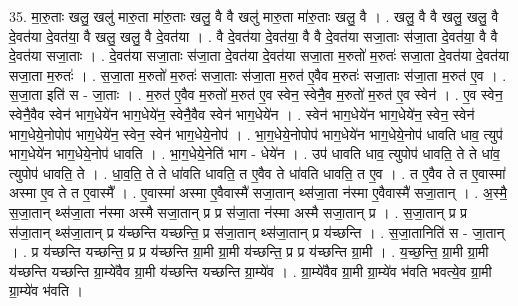 \documentclass[17pt]{extarticle}
\begin{document}
35. मा॒रु॒ताः खलु॒ खलु॑ मारु॒ता मा॑रु॒ताः खलु॒ वै वै खलु॑ मारु॒ता मा॑रु॒ताः खलु॒ वै । . खलु॒ वै वै खलु॒ खलु॒ वै दे॒वत॑या दे॒वत॑या॒ वै खलु॒ खलु॒ वै दे॒वत॑या । . वै दे॒वत॑या दे॒वत॑या॒ वै वै दे॒वत॑या सजा॒ताः स॑जा॒ता दे॒वत॑या॒ वै वै दे॒वत॑या सजा॒ताः । . दे॒वत॑या सजा॒ताः स॑जा॒ता दे॒वत॑या दे॒वत॑या सजा॒ता म॒रुतो॑ म॒रुतः॑ सजा॒ता दे॒वत॑या दे॒वत॑या सजा॒ता म॒रुतः॑ । . स॒जा॒ता म॒रुतो॑ म॒रुतः॑ सजा॒ताः स॑जा॒ता म॒रुत॑ ए॒वैव म॒रुतः॑ सजा॒ताः स॑जा॒ता म॒रुत॑ ए॒व । . स॒जा॒ता इति॑ स - जा॒ताः । . म॒रुत॑ ए॒वैव म॒रुतो॑ म॒रुत॑ ए॒व स्वेन॒ स्वेनै॒व म॒रुतो॑ म॒रुत॑ ए॒व स्वेन॑ । . ए॒व स्वेन॒ स्वेनै॒वैव स्वेन॑ भाग॒धेये॑न भाग॒धेये॑न॒ स्वेनै॒वैव स्वेन॑ भाग॒धेये॑न । . स्वेन॑ भाग॒धेये॑न भाग॒धेये॑न॒ स्वेन॒ स्वेन॑ भाग॒धेये॒नोपोप॑ भाग॒धेये॑न॒ स्वेन॒ स्वेन॑ भाग॒धेये॒नोप॑ । . भा॒ग॒धेये॒नोपोप॑ भाग॒धेये॑न भाग॒धेये॒नोप॑ धावति धाव॒ त्युप॑ भाग॒धेये॑न भाग॒धेये॒नोप॑ धावति । . भा॒ग॒धेये॒नेति॑ भाग - धेये॑न । . उप॑ धावति धाव॒ त्युपोप॑ धावति॒ ते ते धा॑व॒ त्युपोप॑ धावति॒ ते । . धा॒व॒ति॒ ते ते धा॑वति धावति॒ त ए॒वैव ते धा॑वति धावति॒ त ए॒व । . त ए॒वैव ते त ए॒वास्मा॑ अस्मा ए॒व ते त ए॒वास्मै᳚ । . ए॒वास्मा॑ अस्मा ए॒वैवास्मै॑ सजा॒तान् थ्स॑जा॒ता न॑स्मा ए॒वैवास्मै॑ सजा॒तान् । . अ॒स्मै॒ स॒जा॒तान् थ्स॑जा॒ता न॑स्मा अस्मै सजा॒तान् प्र प्र स॑जा॒ता न॑स्मा अस्मै सजा॒तान् प्र । . स॒जा॒तान् प्र प्र स॑जा॒तान् थ्स॑जा॒तान् प्र य॑च्छन्ति यच्छन्ति॒ प्र स॑जा॒तान् थ्स॑जा॒तान् प्र य॑च्छन्ति । . स॒जा॒तानिति॑ स - जा॒तान् । . प्र य॑च्छन्ति यच्छन्ति॒ प्र प्र य॑च्छन्ति ग्रा॒मी ग्रा॒मी य॑च्छन्ति॒ प्र प्र य॑च्छन्ति ग्रा॒मी । . य॒च्छ॒न्ति॒ ग्रा॒मी ग्रा॒मी य॑च्छन्ति यच्छन्ति ग्रा॒म्ये॑वैव ग्रा॒मी य॑च्छन्ति यच्छन्ति ग्रा॒म्ये॑व । . ग्रा॒म्ये॑वैव ग्रा॒मी ग्रा॒म्ये॑व भ॑वति भवत्ये॒व ग्रा॒मी ग्रा॒म्ये॑व भ॑वति । \newline
\end{document}
